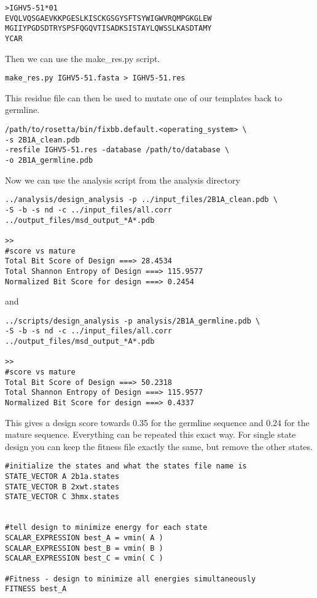 \begin{verbatim}
>IGHV5-51*01
EVQLVQSGAEVKKPGESLKISCKGSGYSFTSYWIGWVRQMPGKGLEW
MGIIYPGDSDTRYSPSFQGQVTISADKSISTAYLQWSSLKASDTAMY
YCAR
\end{verbatim}

Then we can use the make\_res.py script.

\begin{lstlisting}[breaklines=true]
make_res.py IGHV5-51.fasta > IGHV5-51.res
\end{lstlisting}

This residue file can then be used to mutate one of our templates back to germline.
\begin{lstlisting}[breaklines=true]
/path/to/rosetta/bin/fixbb.default.<operating_system> \
-s 2B1A_clean.pdb
-resfile IGHV5-51.res -database /path/to/database \
-o 2B1A_germline.pdb
\end{lstlisting}

Now we can use the analysis script from the analysis directory
\begin{lstlisting}[breaklines=true]
../analysis/design_analysis -p ../input_files/2B1A_clean.pdb \
-S -b -s nd -c ../input_files/all.corr
../output_files/msd_output_*A*.pdb

>>
#score vs mature
Total Bit Score of Design ===> 28.4534
Total Shannon Entropy of Design ===> 115.9577
Normalized Bit Score for design ===> 0.2454
\end{lstlisting}

and

\begin{lstlisting}[breaklines=true]
../scripts/design_analysis -p analysis/2B1A_germline.pdb \
-S -b -s nd -c ../input_files/all.corr
../output_files/msd_output_*A*.pdb

>>
#score vs mature
Total Bit Score of Design ===> 50.2318
Total Shannon Entropy of Design ===> 115.9577
Normalized Bit Score for design ===> 0.4337
\end{lstlisting}

This gives a design score towards 0.35 for the germline sequence and 0.24 for the mature sequence. Everything can be repeated this exact way. For single state design you can keep the fitness file exactly the same, but remove the other states.

\begin{lstlisting}[breaklines=true]
#initialize the states and what the states file name is
STATE_VECTOR A 2b1a.states
STATE_VECTOR B 2xwt.states
STATE_VECTOR C 3hmx.states


#tell design to minimize energy for each state
SCALAR_EXPRESSION best_A = vmin( A )
SCALAR_EXPRESSION best_B = vmin( B )
SCALAR_EXPRESSION best_C = vmin( C )

#Fitness - design to minimize all energies simultaneously
FITNESS best_A
\end{lstlisting}

